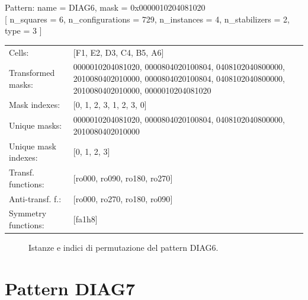 \begin{tcolorbox}[sharp corners, fontupper=\ttfamily\small, colback=white]
  \noindent Pattern: name = DIAG6, mask = 0x0000010204081020\\
  {[} n\_squares = 6, n\_configurations = 729,
  n\_instances = 4, n\_stabilizers = 2, type = 3 { ]}\\[1.0ex]
  \begin{tabularx}{\textwidth}{@{} p{3.5cm} X @{}}
    Cells:               & {[}F1, E2, D3, C4, B5, A6{]}\\[0.5ex]
    Transformed masks:   & 0000010204081020, 0000804020100804, 0408102040800000, 2010080402010000, 0000804020100804, 0408102040800000, 2010080402010000, 0000010204081020\\[0.5ex]
    Mask indexes:        & {[}0, 1, 2, 3, 1, 2, 3, 0{]}\\[0.5ex]
    Unique masks:        & 0000010204081020, 0000804020100804, 0408102040800000, 2010080402010000\\[0.5ex]
    Unique mask indexes: & {[}0, 1, 2, 3{]}\\[0.5ex]
    Transf. functions:   & {[}ro000, ro090, ro180, ro270{]}\\[0.5ex]
    Anti-transf. f.:     & {[}ro000, ro270, ro180, ro090{]}\\[0.5ex]
    Symmetry functions:  & {[}fa1h8{]}\\[0.5ex]
  \end{tabularx}
\end{tcolorbox}

\begin{figure}[htbp]
  \centering
   \hfill
   \hfill
   \hfill
  \vspace{0.3cm}
   \hfill
   \hfill
   \hfill
  \caption{Istanze e indici di permutazione del pattern DIAG6.}
\end{figure}

\newpage

\section{Pattern DIAG7}

